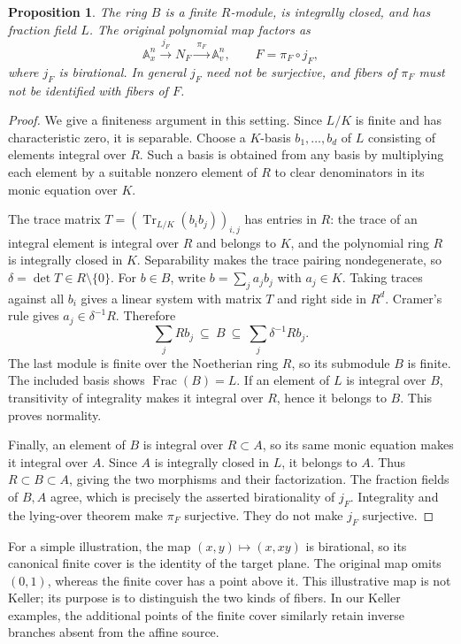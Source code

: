 \documentclass[11pt]{article}
\numberwithin{equation}{section}
\theoremstyle{plain}
\newtheorem{proposition}[theorem]{Proposition}
\theoremstyle{definition}
\theoremstyle{remark}
\newcommand{\A}{\mathbb{A}}
\begin{document}
\begin{proposition}\label{prod:prop:finite-cover}
The ring $B$ is a finite $R$-module, is integrally closed, and has fraction
field $L$. The original polynomial map factors as
\[
 \A^n_x\xrightarrow{\ j_F\ }N_F\xrightarrow{\ \pi_F\ }\A^n_v,
 \qquad F=\pi_F\circ j_F,
\]
where $j_F$ is birational. In general $j_F$ need not be surjective, and
fibers of $\pi_F$ must not be identified with fibers of $F$.
\end{proposition}
\begin{proof}
We give a finiteness argument in this setting. Since $L/K$ is finite and
has characteristic zero, it is separable. Choose a $K$-basis
$b_1,\ldots,b_d$ of $L$ consisting of elements integral over $R$.
Such a basis is obtained from any basis by multiplying each element by
a suitable nonzero element of $R$ to clear denominators in its monic
equation over $K$.

The trace matrix $T=(\operatorname{Tr}_{L/K}(b_i b_j))_{i,j}$ has entries
in $R$: the trace of an integral element is integral over $R$ and belongs
to $K$, and the polynomial ring $R$ is integrally closed in $K$.
Separability makes the trace pairing nondegenerate, so
$\delta=\det T\in R\setminus\{0\}$. For $b\in B$, write
$b=\sum_j a_jb_j$ with $a_j\in K$. Taking traces against all $b_i$
gives a linear system with matrix $T$ and right side in $R^d$.
Cramer's rule gives $a_j\in\delta^{-1}R$. Therefore
\[
 \sum_j Rb_j\ \subseteq\ B\ \subseteq\ \sum_j\delta^{-1}Rb_j.
\]
The last module is finite over the Noetherian ring $R$, so its submodule
$B$ is finite. The included basis shows $\operatorname{Frac}(B)=L$.
If an element of $L$ is integral over $B$, transitivity of integrality
makes it integral over $R$, hence it belongs to $B$. This proves normality.

Finally, an element of $B$ is integral over $R\subset A$, so its same
monic equation makes it integral over $A$. Since $A$ is integrally closed
in $L$, it belongs to $A$. Thus $R\subset B\subset A$, giving the two
morphisms and their factorization. The fraction fields of $B,A$ agree,
which is precisely the asserted birationality of $j_F$. Integrality and
the lying-over theorem make $\pi_F$ surjective. They do not make $j_F$
surjective.
\end{proof}

For a simple illustration, the map $(x,y)\mapsto(x,xy)$ is birational,
so its canonical finite cover is the identity of the target plane.
The original map omits $(0,1)$, whereas the finite cover has a point above
it. This illustrative map is not Keller; its purpose is to distinguish the
two kinds of fibers. In our Keller examples, the additional points of the
finite cover similarly retain inverse branches absent from the affine source.
\end{document}
